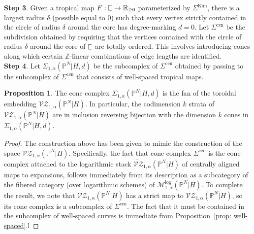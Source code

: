 \documentclass[11pt]{amsart}
\newcommand{\plC}{\scalebox{0.8}[1.3]{$\sqsubset$}}
\newcommand{\Z}{\mathbb{Z}}
\renewcommand{\to}{\rightarrow}
\theoremstyle{definition}
\newtheorem{prop}[thm]{Proposition}
\theoremstyle{definition}
\begin{document}
\noindent
\textbf{Step 3}. Given a tropical map $F: \plC\to \mathbb R_{\geq 0}$ parameterized by $\Sigma^{\mathrm{Kim}}$, there is a largest radius $\delta$ (possible equal to $0$) such that every vertex strictly contained in the circle of radius $\delta$ around the core has degree-marking $d=0$. Let $
\Sigma^{\mathrm{cen}}$ be the subdivision obtained by requiring that the vertices contained with the circle of radius $\delta$ around the core of $\plC$ are totally ordered. This involves introducing cones along which certain $\Z$-linear combinations of edge lengths are identified.\\

\noindent
\textbf{Step 4}. Let $
\Sigma_{1,\alpha}(\mathbb P^N|H,d)$ be the subcomplex of $\Sigma^{\mathrm{cen}}$ obtained by passing to the subcomplex of $\Sigma^{\mathrm{cen}}$ that consists of well-spaced tropical maps.

\begin{prop}
The cone complex $
\Sigma_{1,\alpha}(\mathbb P^N|H,d)$ is the fan of the toroidal embedding $
\mathcal{VZ}_{1,\alpha}(\mathbb P^N|H)$. In particular, the codimension $k$ strata of $
\mathcal{VZ}_{1,\alpha}(\mathbb P^N|H)$ are in inclusion reversing bijection with the dimension $k$ cones in $
\Sigma_{1,\alpha}(\mathbb P^N|H,d)$.
\end{prop}

\begin{proof}
The construction above has been given to mimic the construction of the space $
\mathcal{VZ}_{1,\alpha}(\mathbb P^N|H)$. Specifically, the fact that cone complex $\Sigma^{\mathrm{cen}}$ is the cone complex attached to the logarithmic stack $\widetilde{\mathcal{VZ}}_{1,\alpha}(\mathbb P^N|H)$ of centrally aligned maps to expansions, follows immediately from its description as a subcategory of the fibered category (over logarithmic schemes) of $\mathcal M^{\mathrm{log}}_{1,\alpha}(\mathbb P^N|H)$. To complete the result, we note that $
\mathcal{VZ}_{1,\alpha}(\mathbb P^N|H)$ has a strict map to $
\mathcal{VZ}_{1,\alpha}(\mathbb P^N|H)$, so its cone complex is a subcomplex of $\Sigma^{\mathrm{cen}}$. The fact that it must be contained in the subcomplex of well-spaced curves is immediate from Proposition~\ref{prop: well-spaced}.l
\end{proof}
\end{document}
